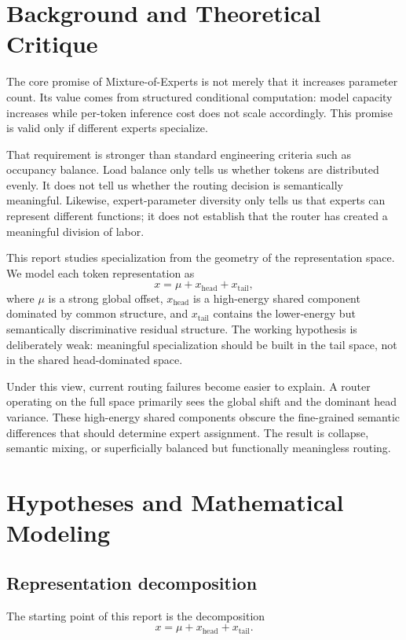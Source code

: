 \documentclass[11pt]{article}
\begin{document}
\section{Background and Theoretical Critique}

The core promise of Mixture-of-Experts is not merely that it increases parameter count. Its value comes from structured conditional computation: model capacity increases while per-token inference cost does not scale accordingly. This promise is valid only if different experts specialize.

That requirement is stronger than standard engineering criteria such as occupancy balance. Load balance only tells us whether tokens are distributed evenly. It does not tell us whether the routing decision is semantically meaningful. Likewise, expert-parameter diversity only tells us that experts can represent different functions; it does not establish that the router has created a meaningful division of labor.

This report studies specialization from the geometry of the representation space. We model each token representation as
\[
x = \mu + x_{\mathrm{head}} + x_{\mathrm{tail}},
\]
where $\mu$ is a strong global offset, $x_{\mathrm{head}}$ is a high-energy shared component dominated by common structure, and $x_{\mathrm{tail}}$ contains the lower-energy but semantically discriminative residual structure. The working hypothesis is deliberately weak: meaningful specialization should be built in the tail space, not in the shared head-dominated space.

Under this view, current routing failures become easier to explain. A router operating on the full space primarily sees the global shift and the dominant head variance. These high-energy shared components obscure the fine-grained semantic differences that should determine expert assignment. The result is collapse, semantic mixing, or superficially balanced but functionally meaningless routing.

\section{Hypotheses and Mathematical Modeling}

\subsection{Representation decomposition}

The starting point of this report is the decomposition
\[
x = \mu + x_{\mathrm{head}} + x_{\mathrm{tail}}.
\]
\end{document}

